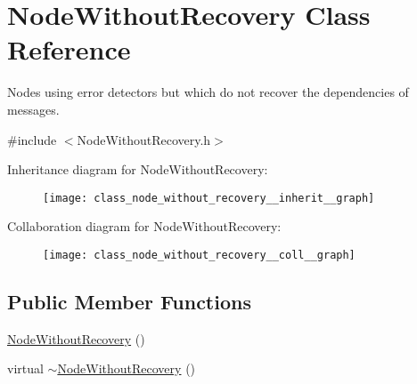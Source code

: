 \hypertarget{class_node_without_recovery}{}\section{Node\+Without\+Recovery Class Reference}
\label{class_node_without_recovery}


Nodes using error detectors but which do not recover the dependencies of messages.  




{\ttfamily \#include $<$Node\+Without\+Recovery.\+h$>$}



Inheritance diagram for Node\+Without\+Recovery\+:
\nopagebreak
\begin{figure}[H]
\begin{center}
\leavevmode
\texttt{[image: class\_node\_without\_recovery\_\_inherit\_\_graph]}
\end{center}
\end{figure}


Collaboration diagram for Node\+Without\+Recovery\+:
\nopagebreak
\begin{figure}[H]
\begin{center}
\leavevmode
\texttt{[image: class\_node\_without\_recovery\_\_coll\_\_graph]}
\end{center}
\end{figure}
\subsection*{Public Member Functions}
\begin{DoxyCompactItemize}
\item 
\hyperlink{class_node_without_recovery_a81c3fab3d91ae3bd6496b876d16694d8}{Node\+Without\+Recovery} ()
\item 
virtual \hyperlink{class_node_without_recovery_a2690cfda5b6d9998ee873babb3418870}{$\sim$\+Node\+Without\+Recovery} ()
\end{DoxyCompactItemize}
